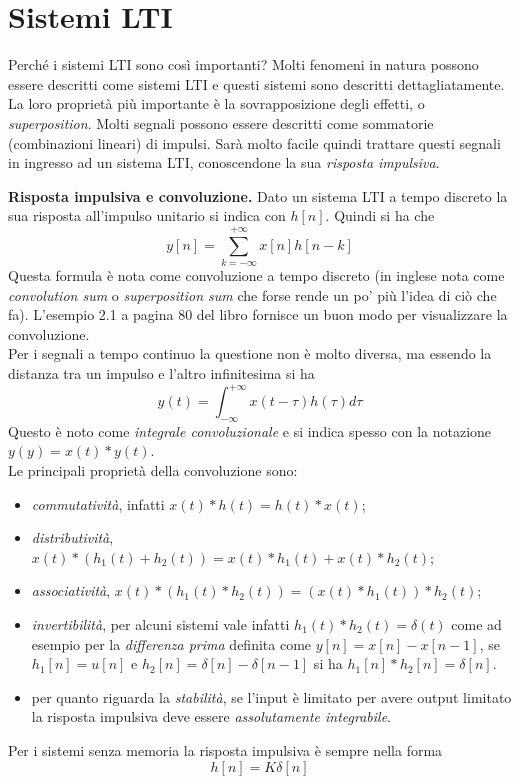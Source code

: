 \documentclass[a4paper,portrait,12pt]{article}
\theoremstyle{definition}
\begin{document}
\section{Sistemi LTI} 

Perché i sistemi LTI sono così importanti? Molti fenomeni in natura possono essere descritti come sistemi LTI
e questi sistemi sono descritti dettagliatamente.\\ 
La loro proprietà più importante è la sovrapposizione degli effetti, o \textit{superposition}. Molti segnali
possono essere descritti come sommatorie (combinazioni lineari) di impulsi. Sarà molto facile quindi trattare
questi segnali in ingresso ad un sistema LTI, conoscendone la sua \textit{risposta impulsiva}.
\bigskip

\textbf{Risposta impulsiva e convoluzione.} Dato un sistema LTI a tempo discreto la sua risposta all'impulso 
unitario si indica con $h[n]$. Quindi si ha che
\begin{equation}
y[n] = \sum_{k=-\infty}^{+\infty}x[n]h[n-k]
\end{equation}
Questa formula è nota come convoluzione a tempo discreto (in inglese nota come \textit{convolution sum} o 
\textit{superposition sum} che forse rende un po' più l'idea di ciò che fa). L'esempio 2.1 a pagina 80
del libro fornisce un buon modo per visualizzare la convoluzione.\\
Per i segnali a tempo continuo la questione non è molto diversa, ma essendo la distanza tra un impulso e
l'altro infinitesima si ha
\begin{equation}
y(t) = \int_{-\infty}^{+\infty}x(t-\tau)h(\tau)d\tau
\end{equation}
Questo è noto come \textit{integrale convoluzionale} e si indica spesso con la notazione 
$y(y)=x(t) \ast y(t)$.\\
Le principali proprietà della convoluzione sono:
\begin{itemize}
\item \textit{commutatività}, infatti $x(t) \ast h(t) = h(t) \ast x(t)$;
\item \textit{distributività}, $x(t) \ast (h_1(t) + h_2(t)) = x(t) \ast h_1(t) + x(t) \ast h_2(t)$;
\item \textit{associatività}, $x(t) \ast (h_1(t) \ast h_2(t)) = (x(t) \ast h_1(t)) \ast h_2(t)$;
\item \textit{invertibilità}, per alcuni sistemi vale infatti $h_1(t) \ast h_2(t) = \delta (t)$ come ad 
	esempio per la \textit{differenza prima} definita come $y[n] = x[n] - x[n-1]$, se $h_1[n] = u[n]$ e
	$h_2[n] = \delta [n] - \delta [n-1]$ si ha $h_1[n] \ast h_2[n] = \delta [n]$.
\item per quanto riguarda la \textit{stabilità}, se l'input è limitato per avere output limitato la risposta
	impulsiva deve essere \textit{assolutamente integrabile}.
\end{itemize}
Per i sistemi senza memoria la risposta impulsiva è sempre nella forma
\begin{equation}
h[n] = K \delta [n]
\end{equation}
\bigskip
\end{document}
